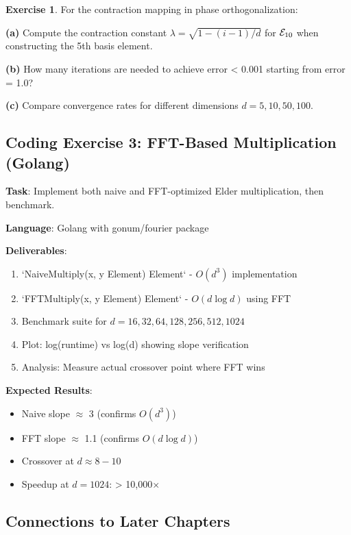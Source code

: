 \documentclass[12pt,a4paper]{article}
\theoremstyle{definition}
\newtheorem{exercise}{Exercise}[section]
\theoremstyle{remark}
\begin{document}
\begin{exercise}
For the contraction mapping in phase orthogonalization:

\textbf{(a)} Compute the contraction constant $\lambda = \sqrt{1 - (i-1)/d}$ for $\mathcal{E}_{10}$ when constructing the 5th basis element.

\textbf{(b)} How many iterations are needed to achieve error < 0.001 starting from error = 1.0?

\textbf{(c)} Compare convergence rates for different dimensions $d = 5, 10, 50, 100$.
\end{exercise}

\subsection{Coding Exercise 3: FFT-Based Multiplication (Golang)}

\begin{tcolorbox}[colback=green!5,colframe=green!70!black,title=Advanced Coding: FFT Optimization]
\textbf{Task}: Implement both naive and FFT-optimized Elder multiplication, then benchmark.

\textbf{Language}: Golang with gonum/fourier package

\textbf{Deliverables}:
\begin{enumerate}
\item `NaiveMultiply(x, y Element) Element` - $O(d^3)$ implementation
\item `FFTMultiply(x, y Element) Element` - $O(d \log d)$ using FFT
\item Benchmark suite for $d = 16, 32, 64, 128, 256, 512, 1024$
\item Plot: log(runtime) vs log(d) showing slope verification
\item Analysis: Measure actual crossover point where FFT wins
\end{enumerate}

\textbf{Expected Results}:
\begin{itemize}
\item Naive slope $\approx$ 3 (confirms $O(d^3)$)
\item FFT slope $\approx$ 1.1 (confirms $O(d \log d)$)
\item Crossover at $d \approx 8-10$
\item Speedup at $d=1024$: > 10,000×
\end{itemize}
\end{tcolorbox}

\subsection{Connections to Later Chapters}
\end{document}
